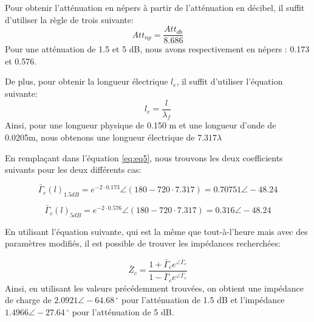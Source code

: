 Pour obtenir l'atténuation en népers à partir de l'atténuation en décibel, il suffit d'utiliser la règle de trois suivante:
\begin{equation}
    Att_{np} = \frac{Att_{db}}{8.686}
\end{equation}
Pour une atténuation de 1.5 et 5 dB, nous avons respectivement en népers : 0.173 et 0.576.

De plus, pour obtenir la longueur électrique $l_e$, il suffit d'utiliser l'équation suivante:
\begin{equation}
    l_e = \frac{l}{\lambda_f}
\end{equation}
Ainsi, pour une longueur physique de 0.150 m et une longueur d'onde de 0.0205m, nous obtenons une longueur électrique de $7.317\lambda$

En remplaçant dans l'équation \ref{eq:eq5}, nous trouvons les deux coefficients suivants pour les deux différents cas:

\begin{equation}
    \bar{\Gamma}_c(l)_{1.5dB} = e^{-2\cdot 0.173} \angle (180 - 720\cdot 7.317) = 0.70751 \angle -48.24
\end{equation}

\begin{equation}
    \bar{\Gamma}_c(l)_{5dB} = e^{-2\cdot 0.576} \angle (180 - 720\cdot 7.317) = 0.316 \angle -48.24
\end{equation}

En utilisant l'équation suivante, qui est la même que tout-à-l'heure mais avec des paramètres modifiés, il est possible de trouver les impédances recherchées:

\begin{equation}
    \bar{Z}_c = \frac{1+\bar{\Gamma}_c e^{\angle \bar{\Gamma}_c}}{1-\bar{\Gamma}_c e^{\angle \bar{\Gamma}_c}}
\end{equation}
Ainsi, en utilisant les valeurs précédemment trouvées, on obtient une impédance de charge de $2.0921 \angle -64.68\,^{\circ}$ pour l'atténuation de 1.5 dB et l'impédance $1.4966 \angle -27.64\,^{\circ}$ pour l'atténuation de 5 dB.

